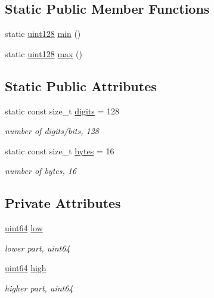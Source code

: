 \subsection*{Static Public Member Functions}
\begin{DoxyCompactItemize}
\item 
static \hyperlink{classuint128}{uint128} \hyperlink{classuint128_a4d43d35f5576c480e4fc1cb63fbfaf78}{min} ()
\item 
static \hyperlink{classuint128}{uint128} \hyperlink{classuint128_a8fc47c78cb71d012c6208c150ca4cf3b}{max} ()
\end{DoxyCompactItemize}
\subsection*{Static Public Attributes}
\begin{DoxyCompactItemize}
\item 
static const size\+\_\+t \hyperlink{classuint128_a08388a396904d541e7e921f1f379b4a1}{digits} = 128
\begin{DoxyCompactList}\small\item\em number of digits/bits, 128 \end{DoxyCompactList}\item 
static const size\+\_\+t \hyperlink{classuint128_a8ddedda58a986c591392955033f74495}{bytes} = 16
\begin{DoxyCompactList}\small\item\em number of bytes, 16 \end{DoxyCompactList}\end{DoxyCompactItemize}
\subsection*{Private Attributes}
\begin{DoxyCompactItemize}
\item 
\hyperlink{types_8h_a60e8696a4678cd348e991a1f172e53f7}{uint64} \hyperlink{classuint128_a439bdff9b7d8dd4bf99616bb07fc2a5e}{low}
\begin{DoxyCompactList}\small\item\em lower part, uint64 \end{DoxyCompactList}\item 
\hyperlink{types_8h_a60e8696a4678cd348e991a1f172e53f7}{uint64} \hyperlink{classuint128_a9f8275501c9a4546f37fae8e85e3ec05}{high}
\begin{DoxyCompactList}\small\item\em higher part, uint64 \end{DoxyCompactList}\end{DoxyCompactItemize}
